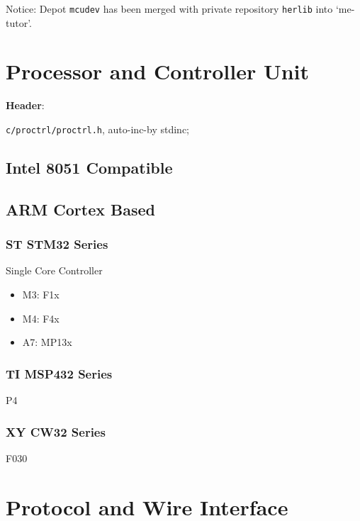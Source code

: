 

Notice: Depot \verb|mcudev| has been merged with private repository \verb|herlib| into `me-tutor'.



\section{Processor and Controller Unit}

\textbf{Header}:

\verb|c/proctrl/proctrl.h|, auto-inc-by stdinc;



\subsection{Intel 8051 Compatible}



\subsection{ARM Cortex Based}



\subsubsection{ST STM32 Series}

Single Core Controller

\begin{itemize}

\item M3: F1x
\item M4: F4x
\item A7: MP13x
\end{itemize}



\subsubsection{TI MSP432 Series}

P4



\subsubsection{XY CW32 Series}

F030



\section{Protocol and Wire Interface}



